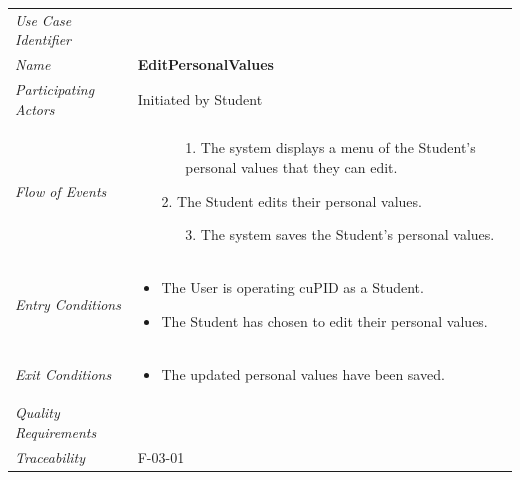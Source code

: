 \documentclass[12pt,letterpaper]{article}
\begin{document}
\begin{center}
	\begin{tabu} to 
		\toprule
		Use Case Identifier & \editpersonalvalues{} \\
		Name & {\bf EditPersonalValues} \\
		Participating Actors & Initiated by Student \\
		Flow of Events & 
		\begin{minipage}[t]{\linewidth}
		    \begin{enumerate}
		        \item[]
		        \begin{enumerate}
				    \item[1.] The system displays a menu of the Student's personal values that they can edit.
		        \end{enumerate}
	            \item[2.] The Student edits their personal values.
	            \begin{enumerate}
				    \item[3.] The system saves the Student's personal values.
		        \end{enumerate}
			\end{enumerate}
		\end{minipage} \\

		Entry Conditions &
		\begin{minipage}[t]{\linewidth}
			\begin{itemize}
			    \item The User is operating cuPID as a Student.
			    \item The Student has chosen to edit their personal values.
	        \end{itemize}
		\end{minipage} \\

		Exit Conditions &
		\begin{minipage}[t]{\linewidth}
			\begin{itemize}
			    \item The updated personal values have been saved.
	        \end{itemize}
		\end{minipage} \\

		Quality Requirements & \\

		Traceability &  F-03-01\\
		\toprule
	\end{tabu}
\end{center}
\end{document}

